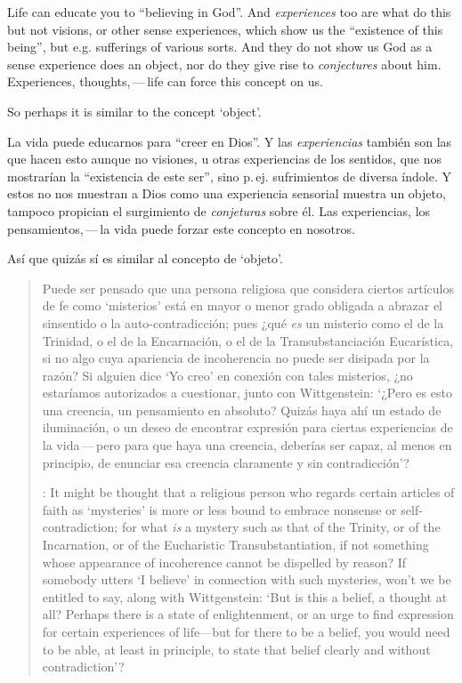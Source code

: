 Life can educate you to ``believing in God''. And \emph{experiences} too are what do this but not visions, or other sense experiences, which show us the ``existence of this being'', but e.g. sufferings of various sorts. And they do not show us God as a sense experience does an object, nor do they give rise to \emph{conjectures} about him. Experiences, thoughts,\,---\,life can force this concept on us.

So perhaps it is similar to the concept `object'.

La vida puede educarnos para ``creer en Dios''. Y las \emph{experiencias} también son las que hacen esto aunque no visiones, u otras experiencias de los sentidos, que nos mostrarían la ``existencia de este ser'', sino p.\,ej. sufrimientos de diversa índole. Y estos no nos muestran a Dios como una experiencia sensorial muestra un objeto, tampoco propician el surgimiento de \emph{conjeturas} sobre él. Las experiencias, los pensamientos,\,---\,la vida puede forzar este concepto en nosotros.

Así que quizás sí es similar al concepto de `objeto'.


\blockquote[{\cite[211]{teichmann2008ans}}: It might be thought that a religious person who regards certain articles of faith as `mysteries' is more or less bound to embrace nonsense or self-contradiction; for what \emph{is} a mystery such as that of the Trinity, or of the Incarnation, or of the Eucharistic Transubstantiation, if not something whose appearance of incoherence cannot be dispelled by reason? If somebody utters `I believe' in connection with such mysteries, won't we be entitled to say, along with Wittgenstein: `But is this a belief, a thought at all? Perhaps there is a state of enlightenment, or an urge to find expression for certain experiences of life---but for there to be a belief, you would need to be able, at least in principle, to state that belief clearly and without contradiction'?]{Puede ser pensado que una persona religiosa que considera ciertos artículos de fe como `misterios' está en mayor o menor grado obligada a abrazar el sinsentido o la auto-contradicción; pues ¿qué \emph{es} un misterio como el de la Trinidad, o el de la Encarnación, o el de la Transubstanciación Eucarística, si no algo cuya apariencia de incoherencia no puede ser disipada por la razón? Si alguien dice `Yo creo' en conexión con tales misterios, ¿no estaríamos autorizados a cuestionar, junto con Wittgenstein: `¿Pero es esto una creencia, un pensamiento en absoluto? Quizás haya ahí un estado de iluminación, o un deseo de encontrar expresión para ciertas experiencias de la vida\,---\,pero para que haya una creencia, deberías ser capaz, al menos en principio, de enunciar esa creencia claramente y sin contradicción'?}

